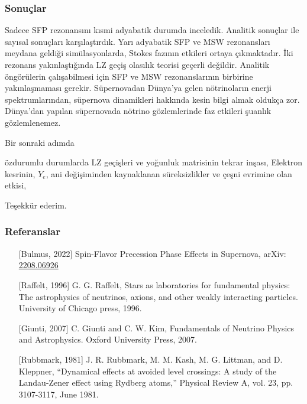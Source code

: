\documentclass[10pt]{beamer}
\begin{document}
\begin{frame}
    \frametitle{Sonuçlar}
    \scriptsize
    \begin{outline}
        \1[\textbullet] Sadece SFP rezonansını kısmi adyabatik durumda inceledik. {\color{red}Analitik sonuçlar ile sayısal sonuçları karşılaştırdık.}
        \1[\textbullet] Yarı adyabatik SFP ve MSW rezonansları meydana geldiği simülasyonlarda, Stokes fazının etkileri ortaya çıkmaktadır. İki rezonans yakınlaştığında LZ geçiş olasılık teorisi geçerli değildir. 
        \1[\textbullet] Analitik öngörülerin çalışabilmesi için SFP ve MSW rezonanslarının birbirine yakınlaşmaması gerekir.
        \1[\textbullet] Süpernovadan Dünya'ya gelen nötrinoların enerji spektrumlarından, süpernova dinamikleri hakkında kesin bilgi almak oldukça zor.
        \1[\textbullet] Dünya'dan yapılan süpernovada nötrino gözlemlerinde faz etkileri şuanlık gözlemlenemez.
    \end{outline}
    
    Bir sonraki adımda 
    \begin{outline}
         özdurumlu durumlarda LZ geçişleri ve yoğunluk matrisinin tekrar inşası,
        \1[\textbullet] Elektron kesrinin, $Y_{e}$, ani değişiminden kaynaklanan süreksizlikler ve çeşni evrimine olan etkisi,
    \end{outline}
    \normalsize
    
\end{frame}

\begin{frame}
    \huge
    \begin{center}
        Teşekkür ederim.
    \end{center}
\end{frame}

\begin{frame}
    \frametitle{Referanslar}
    \footnotesize
    \begin{itemize}
        \item[] [Bulmus, 2022] Spin-Flavor Precession Phase Effects in Supernova, arXiv: \href{https://arxiv.org/abs/2208.06926}{2208.06926}
        \item[] [Raffelt, 1996] G. G. Raffelt, Stars as laboratories for fundamental physics: The astrophysics of neutrinos, axions, and other weakly interacting particles. University of Chicago press, 1996.        
        \item[] [Giunti, 2007] C. Giunti and C. W. Kim, Fundamentals of Neutrino Physics and Astrophysics. Oxford University Press, 2007.        
        \item[] [Rubbmark, 1981]  J. R. Rubbmark, M. M. Kash, M. G. Littman, and D. Kleppner, “Dynamical effects at avoided level crossings: A study of the Landau-Zener effect using Rydberg atoms,” Physical Review A, vol. 23, pp. 3107-3117, June 1981.
    \end{itemize}
    \normalsize
\end{frame}
\end{document}
